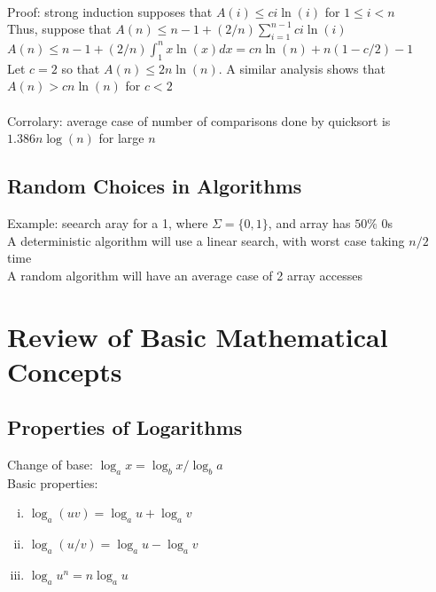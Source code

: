 \documentclass{article}
\begin{document}
			\\
			Proof: strong induction supposes that $A(i) \leq ci\ln(i)$ for $1 \leq i < n$ \\
			Thus, suppose that $A(n) \leq n - 1 + (2/n)\sum_{i = 1}^{n - 1} ci \ln(i)$ \\
			$A(n) \leq n - 1 + (2/n)\int_1^n x \ln(x) dx = cn\ln(n) + n(1 - c/2) - 1$ \\
			Let $c = 2$ so that $A(n) \leq 2 n\ln(n)$. A similar analysis shows that $A(n) > cn\ln(n)$ for $c < 2$ \\
			\\
			Corrolary: average case of number of comparisons done by quicksort is $1.386n\log(n)$ for large $n$
		\subsection{Random Choices in Algorithms}
			Example: seearch aray for a 1, where $\Sigma = \{0, 1\}$, and array has $50\%$ 0s \\
			A deterministic algorithm will use a linear search, with worst case taking $n/2$ time \\
			A random algorithm will have an average case of 2 array accesses 
		\clearpage
		
	\appendix

	\section{Review of Basic Mathematical Concepts}
		\subsection{Properties of Logarithms}
			Change of base: $\log_a x = \log_b x/\log_b a$ \\
			Basic properties:
			\begin{enumerate}[(i)]
				\item $\log_a(uv) = \log_a u + \log_a v$
				\item $\log_a(u / v) = \log_a u - \log_a v$
				\item $\log_a u^n = n \log_a u$
				\end{enumerate}



	
\end{document}
